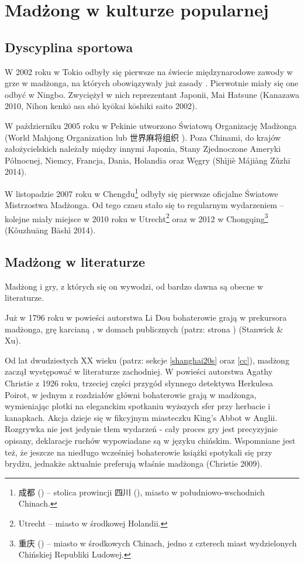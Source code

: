 \section{Madżong w kulturze popularnej}

\subsection{Dyscyplina sportowa}
\label{pierwsze_mistrzostwa}
W 2002 roku w Tokio odbyły się pierwsze na świecie międzynarodowe zawody w grze
w madżonga, na których obowiązywały już zasady 
. Pierwotnie miały się one odbyć w Ningbo. Zwyciężył w nich
reprezentant Japonii, Mai Hatsune (Kanazawa 2010, Nihon kenkō asa shō kyōkai
kōshiki saito 2002).

\label{wmo}
W październiku 2005 roku w Pekinie utworzono Światową Organizację Madżonga
(World Mahjong Organization lub 世界麻将组织 ).
Poza Chinami, do krajów założycielskich należały między innymi Japonia, Stany
Zjednoczone Ameryki Północnej, Niemcy, Francja, Dania, Holandia oraz Węgry
(Shìjiè Májiàng Zǔzhī 2014).

W listopadzie 2007 roku w Chengdu\footnote{成都 () -- stolica
prowincji 四川 (), miasto w południowo-wschodnich Chinach.} odbyły
się pierwsze oficjalne Światowe Mistrzostwa Madżonga. Od tego czasu stało się to
regularnym wydarzeniem -- kolejne miały miejsce w 2010 roku w
Utrecht\footnote{Utrecht --  miasto w środkowej Holandii.} oraz w 2012 w
Chongqing\footnote{重庆 () -- miasto w środkowych Chinach, jedno
z czterech miast wydzielonych Chińskiej Republiki Ludowej.} (Kǒuzhuāng Bāshì
2014).

\subsection{Madżong w literaturze}
\label{mahjong_literature}
Madżong i gry, z których się on wywodzi, od bardzo dawna są obecne w
literaturze. 

Już w 1796 roku w powieści 
autorstwa Li Dou bohaterowie grają w prekursora madżonga, grę karcianą
, w domach publicznych (patrz: strona \pageref{li_dou}) (Stanwick
\& Xu).

Od lat dwudziestych XX wieku (patrz: sekcje \ref{shanghai20s} oraz \ref{cc}),
madżong zaczął występować w literaturze zachodniej. W powieści  autorstwa Agathy Christie z 1926 roku, trzeciej części przygód
słynnego detektywa Herkulesa Poirot, w jednym z rozdziałów główni bohaterowie grają w
madżonga, wymieniając plotki na eleganckim spotkaniu wyższych sfer przy
herbacie i kanapkach. Akcja dzieje się w fikcyjnym miasteczku King's Abbot w
Anglii. Rozgrywka nie jest jedynie tłem wydarzeń - cały proces gry jest
precyzyjnie opisany, deklaracje ruchów wypowiadane są w języku chińskim.
Wspomniane jest też, że jeszcze na niedługo wcześniej bohaterowie książki
spotykali się przy brydżu, jednakże aktualnie preferują właśnie madżonga
(Christie 2009).

